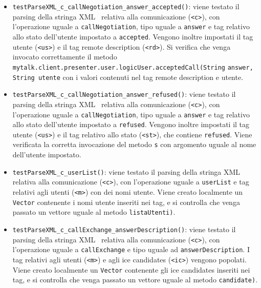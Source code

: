 {\begin{sloppypar}
{{\begin{itemize}
\begin{itemize}
\begin{itemize}
						\item \texttt{testParseXML\_c\_callNegotiation\_answer\_accepted()}: viene testato il parsing della stringa XML\g~ relativa alla comunicazione (\texttt{<c>}), con l'operazione uguale a \texttt{callNegotiation}, tipo uguale a \texttt{answer} e tag relativo allo stato dell'utente impostato a \texttt{accepted}. Vengono inoltre impostati il tag utente (\texttt{<us>}) e il tag remote description (\texttt{<rd>}). Si verifica che venga invocato correttamente il metodo \texttt{mytalk.client.presenter.user.logicUser.acceptedCall(String} \texttt{answer, String utente} con i valori contenuti nel tag remote description e utente.
						
						\item \texttt{testParseXML\_c\_callNegotiation\_answer\_refused()}: viene testato il parsing della stringa XML\g~ relativa alla comunicazione (\texttt{<c>}), con l'operazione uguale a \texttt{callNegotiation}, tipo uguale a \texttt{answer} e tag relativo allo stato dell'utente impostato a \texttt{refused}. Vengono inoltre impostati il tag utente (\texttt{<us>}) e il tag relativo allo stato (\texttt{<st>}), che contiene \texttt{refused}. Viene verificata la corretta invocazione del metodo  \texttt{s} con argomento uguale al nome dell'utente impostato.
						
						\item \texttt{testParseXML\_c\_userList()}: viene testato il parsing della stringa XML\g~ relativa alla comunicazione (\texttt{<c>}), con l'operazione uguale a \texttt{userList} e tag relativi agli utenti (\texttt{<m>}) con dei nomi utente. Viene creato localmente un \texttt{Vector} contenente i nomi utente inseriti nei tag, e si controlla che venga passato un vettore uguale al metodo  \texttt{listaUtenti)}.
						
						\item \texttt{testParseXML\_c\_callExchange\_answerDescription()}: viene testato il parsing della stringa XML\g~ relativa alla comunicazione (\texttt{<c>}), con l'operazione uguale a \texttt{callExchange} e tipo uguale ad \texttt{answerDescription}. I tag relativi agli utenti (\texttt{<m>}) e agli ice candidates (\texttt{<ic>}) vengono popolati. Viene creato localmente un \texttt{Vector} contenente gli ice candidates inseriti nei tag, e si controlla che venga passato un vettore uguale al metodo  \texttt{candidate)}.
						

\end{itemize}
\end{itemize}
\end{itemize}}}
\end{sloppypar}}
